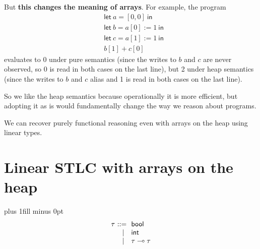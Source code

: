 \documentclass{article}
\newcommand{\bnfeq}{&::=&}
\newcommand{\bnfalt}{&~\mid&}
\newcommand{\kw}[1]{\ensuremath{\mathsf{#1}}}
\newcommand{\unit}{\ensuremath{\kw{unit}}}
\newcommand{\bool}{\ensuremath{\kw{bool}}}
\newcommand{\tyint}{\ensuremath{\kw{int}}}
\newcommand{\linto}{\ensuremath{\multimap}}
\newcommand{\letin}[2]{\kw{let}\ #1 = #2\ \kw{in}}
\begin{document}
But \textbf{this changes the meaning of arrays}. For example, the program
\begin{align*}
  &\letin{a}{[0, 0]}\\
  &\letin{b}{a[0] := 1}\\
  &\letin{c}{a[1] := 1}\\
  &b[1] + c[0]
\end{align*}
evaluates to 0 under pure semantics (since the writes to $b$ and $c$
are never observed, so 0 is read in both cases on the last line), but
2 under heap semantics (since the writes to $b$ and $c$ alias and 1 is
read in both cases on the last line).

So we like the heap semantics because operationally it is more
efficient, but adopting it as is would fundamentally change the way
we reason about programs.

We can recover purely functional reasoning even with arrays on the
heap using linear types.

\clearpage
\section*{Linear STLC with arrays on the heap}

{
\noindent
\hskip 1cm plus 1fill minus 0pt
\[
\begin{array}{r@{~}c@{~~}l}
  \tau \bnfeq
       \bool\\
       \bnfalt \tyint\\
       \bnfalt \tau\linto\tau\\\\
\end{array}
\]
}
\end{document}
